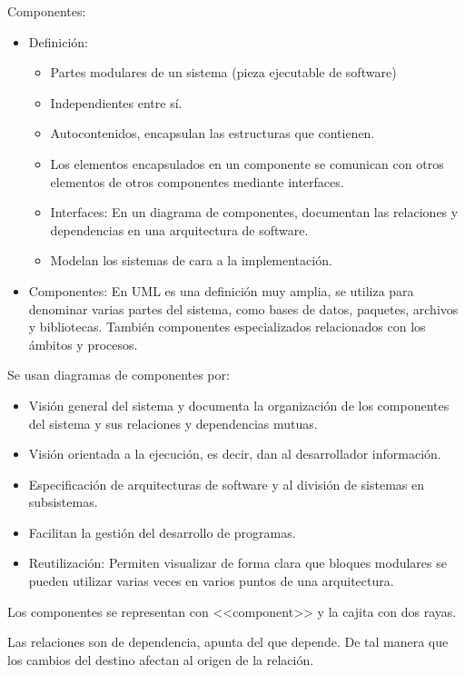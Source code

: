\documentclass[12pt, twoside, openright]{report} %
\begin{document}
Componentes:
\begin{itemize}
	\item Definición:
	      \begin{itemize}
		      \item Partes modulares de un sistema (pieza ejecutable de software)
		      \item Independientes entre sí.
		      \item Autocontenidos, encapsulan las estructuras que contienen.
		      \item Los elementos encapsulados en un componente se comunican con
		            otros elementos de otros componentes mediante interfaces.
		      \item Interfaces: En un diagrama de componentes, documentan las
		            relaciones y dependencias en una arquitectura de software.
		      \item Modelan los sistemas de cara a la implementación.
	      \end{itemize}
	\item Componentes: En UML es una definición muy amplia, se utiliza para
	      denominar varias partes del sistema, como bases de datos,
	      paquetes, archivos y bibliotecas. También componentes
	      especializados relacionados con los ámbitos y procesos.
\end{itemize}

Se usan diagramas de componentes por:
\begin{itemize}
	\item Visión general del sistema y documenta la organización de los
	      componentes del sistema y sus relaciones y dependencias mutuas.
	\item Visión orientada a la ejecución, es decir, dan al desarrollador
	      información.
	\item Especificación de arquitecturas de software y al división de
	      sistemas en subsistemas.
	\item Facilitan la gestión del desarrollo de programas.
	\item Reutilización: Permiten visualizar de forma clara que bloques
	      modulares se pueden utilizar varias veces en varios puntos de una
	      arquitectura.
\end{itemize}

Los componentes se representan con <<component>> y la
cajita con dos rayas.


Las relaciones son de dependencia, apunta del que depende. De tal
manera que los cambios del destino afectan al origen de la relación.
\end{document}
